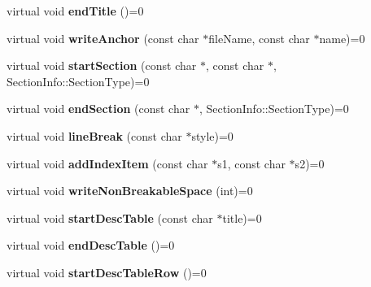 \begin{DoxyCompactItemize}
virtual void {\bfseries end\+Title} ()=0
\item 
\mbox{\label{class_base_output_doc_interface_a02ec04af87e175323ad789347884c896}} 
virtual void {\bfseries write\+Anchor} (const char $\ast$file\+Name, const char $\ast$name)=0
\item 
\mbox{\label{class_base_output_doc_interface_a820f65539d9328cfafe23a2542375853}} 
virtual void {\bfseries start\+Section} (const char $\ast$, const char $\ast$, Section\+Info\+::\+Section\+Type)=0
\item 
\mbox{\label{class_base_output_doc_interface_a754ab1bd2b1a2cf82ac1207822e76f59}} 
virtual void {\bfseries end\+Section} (const char $\ast$, Section\+Info\+::\+Section\+Type)=0
\item 
\mbox{\label{class_base_output_doc_interface_ada61ce97bb848a4e73f60c351e217391}} 
virtual void {\bfseries line\+Break} (const char $\ast$style)=0
\item 
\mbox{\label{class_base_output_doc_interface_acc5ad4f6230310456380f4db9a407161}} 
virtual void {\bfseries add\+Index\+Item} (const char $\ast$s1, const char $\ast$s2)=0
\item 
\mbox{\label{class_base_output_doc_interface_a7a6903af564a1de397adb0887e7e419a}} 
virtual void {\bfseries write\+Non\+Breakable\+Space} (int)=0
\item 
\mbox{\label{class_base_output_doc_interface_ae8d272c529f66d55e23b63a8cbb1abd7}} 
virtual void {\bfseries start\+Desc\+Table} (const char $\ast$title)=0
\item 
\mbox{\label{class_base_output_doc_interface_acad6dba3f360141250109216856eff38}} 
virtual void {\bfseries end\+Desc\+Table} ()=0
\item 
\mbox{\label{class_base_output_doc_interface_a86e5f61be7418b8b398e7e9a8863a13d}} 
virtual void {\bfseries start\+Desc\+Table\+Row} ()=0

\end{DoxyCompactItemize}
